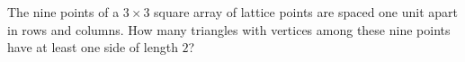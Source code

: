 The nine points of a $3\times3$ square array of lattice points are spaced one unit apart in rows and columns. How many triangles with vertices among these nine points have at least one side of length $2$?
